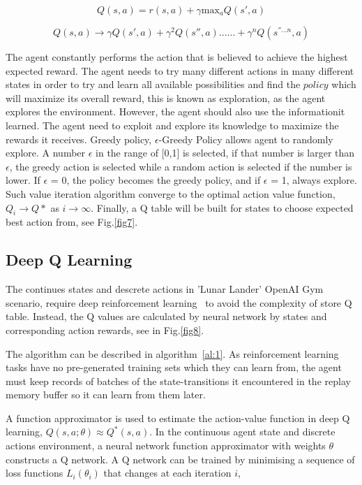 \documentclass[conference]{IEEEtran}
\begin{document}
\begin{equation}\label{eqn:2}
    Q(s,a) = r(s,a) + \gamma \text{max}_a Q(s',a)
\end{equation}

\begin{equation}\label{eqn:3}
    Q(s,a) \rightarrow \gamma Q(s',a) + \gamma^2 Q(s'',a)......+\gamma^n Q(s^{''...n},a)
\end{equation}

The agent constantly performs the action that is believed to achieve the highest expected reward. The agent needs to try many different actions in many different states in order to try and learn all available possibilities and find the $policy$ which will maximize its overall reward, this is known as exploration, as the agent explores the environment. However, the agent should also use the informationit learned. The agent need to exploit and explore its knowledge to maximize the rewards it receives. Greedy policy, $\epsilon$-Greedy Policy allows agent to randomly explore. A number $\epsilon$ in the range of [0,1] is selected, if that number is larger than $\epsilon$, the greedy action is selected while a random action is selected if the number is lower. If $\epsilon$ = 0, the policy becomes the greedy policy, and if $\epsilon$ = 1, always explore. Such value iteration algorithm converge to the optimal action value function, $Q_i \rightarrow Q{}*$ as $i \rightarrow \infty$.  Finally, a Q table will be built for states to choose expected best action from, see Fig.\ref{fig7}.

\subsection{Deep Q Learning}\label{sub:DQ}

The continues states and descrete actions in 'Lunar Lander' OpenAI Gym scenario, require deep reinforcement learning~\cite{b1} to avoid the complexity of store Q table. Instead, the Q values are calculated by neural network by states and corresponding action rewards, see in Fig.\ref{fig8}.

The algorithm can be described in algorithm~\ref{al:1}. As reinforcement learning tasks have no pre-generated training sets which they can learn from, the agent must keep records of batches of the state-transitions it encountered in the replay memory buffer so it can learn from them later.

A function approximator is used to estimate the action-value function in deep Q learning, $Q(s,a;\theta) \approx Q^{*}(s,a)$. In the continuous agent state and discrete actions environment, a neural network function approximator with weights $\theta$ constructs a Q network. A Q network can be trained by minimising a sequence of loss functions $L_i(\theta_i)$ that changes at each iteration $i$,
\end{document}
